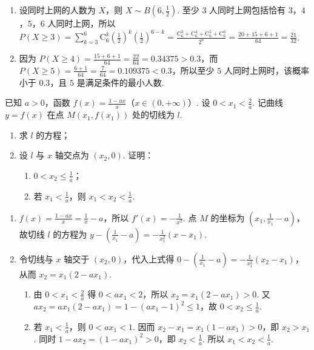 \begin{solution}
\begin{enumerate}
\item 设同时上网的人数为 \(X\)，则 \(X\sim B\left(6,\frac{1}{2}\right)\). 至少 \(3\) 人同时上网包括恰有 \(3\)，\(4\)，\(5\)，\(6\) 人同时上网，所以
\(P(X\geqslant3)=\sum_{k=3}^{6}\mathrm C_{6}^{k}\left(\frac{1}{2}\right)^{k}\left(\frac{1}{2}\right)^{6-k}=\frac{\mathrm C_{6}^{3}+\mathrm C_{6}^{4}+\mathrm C_{6}^{5}+\mathrm C_{6}^{6}}{2^{6}}=\frac{20+15+6+1}{64}=\frac{21}{32}\).
\item 因为 \(P(X\geqslant4)=\frac{15+6+1}{64}=\frac{22}{64}=0.34375>0.3\)，而 \(P(X\geqslant5)=\frac{6+1}{64}=\frac{7}{64}=0.109375<0.3\)，所以至少 \(5\) 人同时上网时，该概率小于 \(0.3\)，且 \(5\) 是满足条件的最小人数.
\end{enumerate}
\end{solution}

\begin{problem}
已知 \(a > 0\)，函数 \(f(x) = \frac{1 - ax}{x}\)（\(x \in (0, +\infty)\)）. 设 \(0 < x_1 < \frac{2}{a}\). 记曲线 \(y = f(x)\) 在点 \(M(x_1, f(x_1))\) 处的切线为 \(l\).

\begin{enumerate}
\item 求 \(l\) 的方程；
\item 设 \(l\) 与 \(x\) 轴交点为 \((x_{2},0)\). 证明：
\begin{enumerate}
\item \(0 < x_{2} \leqslant \frac{1}{a}\)；
\item 若 \(x_{1} < \frac{1}{a}\)，则 \(x_{1} < x_{2} < \frac{1}{a}\).
\end{enumerate}
\end{enumerate}
\end{problem}

\begin{solution}
\begin{enumerate}
\item \(f(x)=\frac{1-ax}{x}=\frac{1}{x}-a\)，所以 \(f'(x)=-\frac{1}{x^{2}}\). 点 \(M\) 的坐标为 \(\left(x_{1},\frac{1}{x_{1}}-a\right)\)，故切线 \(l\) 的方程为
\(y-\left(\frac{1}{x_{1}}-a\right)=-\frac{1}{x_{1}^{2}}(x-x_{1})\).

\item 令切线与 \(x\) 轴交于 \((x_{2},0)\)，代入上式得
\(0-\left(\frac{1}{x_{1}}-a\right)=-\frac{1}{x_{1}^{2}}(x_{2}-x_{1})\)，从而 \(x_{2}=x_{1}(2-ax_{1})\).
\begin{enumerate}
\item 由 \(0<x_{1}<\frac{2}{a}\) 得 \(0<ax_{1}<2\)，所以 \(x_{2}=x_{1}(2-ax_{1})>0\). 又
\(ax_{2}=ax_{1}(2-ax_{1})=1-(ax_{1}-1)^{2}\leqslant1\)，故 \(0<x_{2}\leqslant\frac{1}{a}\).
\item 若 \(x_{1}<\frac{1}{a}\)，则 \(0<ax_{1}<1\). 因而
\(x_{2}-x_{1}=x_{1}(1-ax_{1})>0\)，即 \(x_{2}>x_{1}\). 同时 \(1-ax_{2}=(1-ax_{1})^{2}>0\)，即 \(x_{2}<\frac{1}{a}\). 所以 \(x_{1}<x_{2}<\frac{1}{a}\).
\end{enumerate}
\end{enumerate}
\end{solution}

